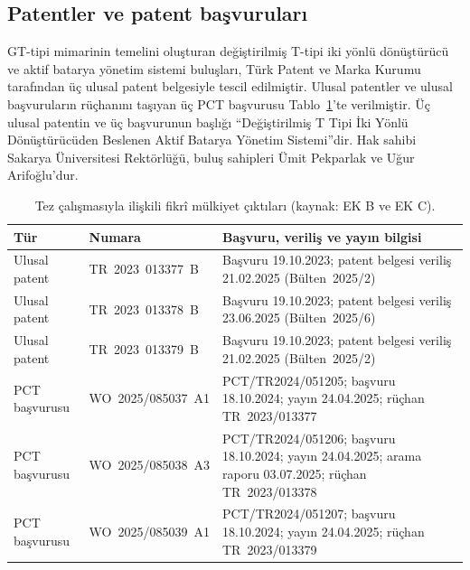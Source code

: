 \subsection{Patentler ve patent başvuruları}

GT-tipi mimarinin temelini oluşturan değiştirilmiş T-tipi iki yönlü dönüştürücü ve aktif batarya yönetim sistemi buluşları, Türk Patent ve Marka Kurumu tarafından üç ulusal patent belgesiyle tescil edilmiştir. Ulusal patentler ve ulusal başvuruların rüçhanını taşıyan üç PCT başvurusu Tablo~\ref{tab:fikri-mulkiyet}'te verilmiştir. Üç ulusal patentin ve üç başvurunun başlığı ``Değiştirilmiş T Tipi İki Yönlü Dönüştürücüden Beslenen Aktif Batarya Yönetim Sistemi''dir. Hak sahibi Sakarya Üniversitesi Rektörlüğü, buluş sahipleri Ümit Pekparlak ve Uğur Arifoğlu'dur.

\begin{table}[H]
  \centering
  \caption{Tez çalışmasıyla ilişkili fikrî mülkiyet çıktıları (kaynak: EK B ve EK C).}
  \label{tab:fikri-mulkiyet}
  \small
  \begin{tabularx}{\textwidth}{@{}>{\raggedright\arraybackslash}p{}%
                                  >{\raggedright\arraybackslash}p{}%
                                  >{\raggedright\arraybackslash}X@{}}
    \toprule
    \textbf{Tür} & \textbf{Numara} & \textbf{Başvuru, veriliş ve yayın bilgisi} \\
    \midrule
    Ulusal patent & TR~2023~013377~B & Başvuru 19.10.2023; patent belgesi veriliş 21.02.2025 (Bülten~2025/2) \\ \addlinespace
    Ulusal patent & TR~2023~013378~B & Başvuru 19.10.2023; patent belgesi veriliş 23.06.2025 (Bülten~2025/6) \\ \addlinespace
    Ulusal patent & TR~2023~013379~B & Başvuru 19.10.2023; patent belgesi veriliş 21.02.2025 (Bülten~2025/2) \\ \addlinespace
    PCT başvurusu & WO~2025/085037~A1 & PCT/TR2024/051205; başvuru 18.10.2024; yayın 24.04.2025; rüçhan TR~2023/013377 \\ \addlinespace
    PCT başvurusu & WO~2025/085038~A3 & PCT/TR2024/051206; başvuru 18.10.2024; yayın 24.04.2025; arama raporu 03.07.2025; rüçhan TR~2023/013378 \\ \addlinespace
    PCT başvurusu & WO~2025/085039~A1 & PCT/TR2024/051207; başvuru 18.10.2024; yayın 24.04.2025; rüçhan TR~2023/013379 \\
    \bottomrule
  \end{tabularx}
\end{table}

